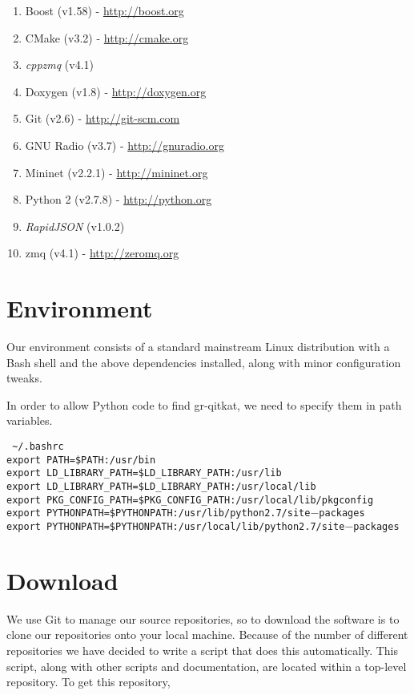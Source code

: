 \documentclass[letterpaper,twoside=false]{scrbook}
\newcommand{\code}[1]{\texttt{#1}}
\begin{document}
		\begin{enumerate}
			\item Boost (v1.58) - \url{http://boost.org}
			\item CMake (v3.2) - \url{http://cmake.org}
			\item \textit{cppzmq} (v4.1)
			\item Doxygen (v1.8) - \url{http://doxygen.org}
			\item Git (v2.6) - \url{http://git-scm.com}
			\item GNU Radio (v3.7) - \url{http://gnuradio.org}
			\item Mininet (v2.2.1) - \url{http://mininet.org}
			\item Python 2 (v2.7.8) - \url{http://python.org}
			\item \textit{RapidJSON} (v1.0.2)
			\item zmq (v4.1) - \url{http://zeromq.org}
		\end{enumerate}
	
	\section{Environment}

		Our environment consists of a standard mainstream Linux distribution with a Bash shell and the above dependencies installed, along with minor configuration tweaks.

		In order to allow Python code to find gr-qitkat, we need to specify them in path variables.
		
		\code{
			\textasciitilde/.bashrc\\
			export PATH=\$PATH:/usr/bin \\
			export LD\_LIBRARY\_PATH=\$LD\_LIBRARY\_PATH:/usr/lib\\
			export LD\_LIBRARY\_PATH=\$LD\_LIBRARY\_PATH:/usr/local/lib\\
			export PKG\_CONFIG\_PATH=\$PKG\_CONFIG\_PATH:/usr/local/lib/pkgconfig\\
			export PYTHONPATH=\$PYTHONPATH:/usr/lib/python2.7/site$-$packages\\
			export PYTHONPATH=\$PYTHONPATH:/usr/local/lib/python2.7/site$-$packages \\ }
	
	\section{Download}
 		
 		We use Git to manage our source repositories, so to download the software is to clone our repositories onto your local machine. Because of the number of different repositories we have decided to write a script that does this automatically. This script, along with other scripts and documentation, are located within a top-level repository. To get this repository,
 		
\end{document}
